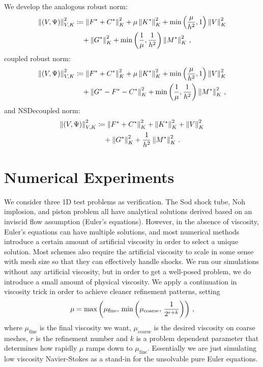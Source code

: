 \documentclass[Dissertation.tex]{subfiles}
\begin{document}
We develop the analogous robust norm:
\begin{align*}
\left\| \left( V,\Psi \right) \right\|_{V,K}^2 &\coloneqq
\left\| F^*+C^* \right\|_K^2
+ \mu\left\| K^* \right\|_K^2
+ \min\left( \frac{\mu}{h^2},1 \right)\left\| V \right\|^2_K
\\\nonumber&\quad
+ \left\| G^* \right\|_K^2
+ \min\left( \frac{1}{\mu},\frac{1}{h^2} \right)\left\| M^* \right\|_K^2\,,
\end{align*}
coupled robust norm:
\begin{align*}
\left\| \left( V,\Psi \right) \right\|_{V,K}^2 &\coloneqq
\left\| F^*+C^* \right\|_K^2
+ \mu\left\| K^* \right\|_K^2
+ \min\left( \frac{\mu}{h^2},1 \right)\left\| V \right\|^2_K
\\\nonumber&\quad
+ \left\| G^*-F^*-C^* \right\|_K^2
+ \min\left( \frac{1}{\mu},\frac{1}{h^2} \right)\left\| M^* \right\|_K^2\,,
\end{align*}
and NSDecoupled norm:
\begin{align*}
\left\| \left( V,\Psi \right) \right\|_{V,K}^2 &\coloneqq
\left\| F^*+C^* \right\|_K^2
+ \left\| K^* \right\|_K^2
+ \left\| V \right\|^2_K
\\\nonumber&\quad
+ \left\| G^* \right\|_K^2
+ \frac{1}{h^2}\left\| M^* \right\|_K^2\,.
\end{align*}


\section{Numerical Experiments}
We consider three 1D test problems as verification.
The Sod shock tube, Noh implosion, and piston problem all have analytical solutions derived based on an inviscid flow assumption (Euler's equations).
However, in the absence of viscosity, Euler's equations can have multiple solutions, and most numerical methods introduce a certain amount of
artificial viscosity in order to select a unique solution.
Most schemes also require the artificial viscosity to scale in some sense with mesh size so that they can effectively handle shocks.
We run our simulations without any artificial viscosity, but in order to get a well-posed problem, we do introduce a small amount of physical viscosity.
We apply a continuation in viscosity trick in order to achieve cleaner refinement patterns, setting
\[
\mu=\max\left( \mu_\text{fine},\,\min\left( \mu_\text{coarse},\,\frac{1}{2^{r+k}} \right) \right)\,,
\]
where $\mu_\text{fine}$ is the final viscosity we want, $\mu_\text{coarse}$ 
is the desired viscosity on coarse meshes,
$r$ is the refinement number and $k$ is a problem dependent parameter that determines how rapidly $\mu$
ramps down to $\mu_\text{fine}$.
Essentially we are just simulating low viscosity Navier-Stokes as a stand-in for the unsolvable pure Euler equations.
\end{document}
